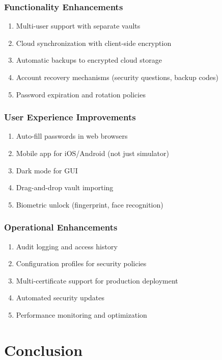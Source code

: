 \documentclass[12pt,a4paper]{report}
\begin{document}
\subsection{Functionality Enhancements}

\begin{enumerate}
    \item Multi-user support with separate vaults
    \item Cloud synchronization with client-side encryption
    \item Automatic backups to encrypted cloud storage
    \item Account recovery mechanisms (security questions, backup codes)
    \item Password expiration and rotation policies
\end{enumerate}

\subsection{User Experience Improvements}

\begin{enumerate}
    \item Auto-fill passwords in web browsers
    \item Mobile app for iOS/Android (not just simulator)
    \item Dark mode for GUI
    \item Drag-and-drop vault importing
    \item Biometric unlock (fingerprint, face recognition)
\end{enumerate}

\subsection{Operational Enhancements}

\begin{enumerate}
    \item Audit logging and access history
    \item Configuration profiles for security policies
    \item Multi-certificate support for production deployment
    \item Automated security updates
    \item Performance monitoring and optimization
\end{enumerate}

\chapter{Conclusion}
\end{document}
